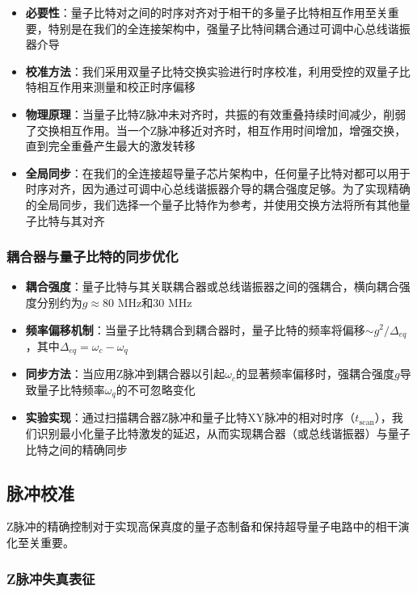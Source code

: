 \documentclass[11pt,a4paper]{article}
\begin{document}
\begin{itemize}
    \item \textbf{必要性}：量子比特对之间的时序对齐对于相干的多量子比特相互作用至关重要，特别是在我们的全连接架构中，强量子比特间耦合通过可调中心总线谐振器介导
    \item \textbf{校准方法}：我们采用双量子比特交换实验进行时序校准，利用受控的双量子比特相互作用来测量和校正时序偏移
    \item \textbf{物理原理}：当量子比特Z脉冲未对齐时，共振的有效重叠持续时间减少，削弱了交换相互作用。当一个Z脉冲移近对齐时，相互作用时间增加，增强交换，直到完全重叠产生最大的激发转移
    \item \textbf{全局同步}：在我们的全连接超导量子芯片架构中，任何量子比特对都可以用于时序对齐，因为通过可调中心总线谐振器介导的耦合强度足够。为了实现精确的全局同步，我们选择一个量子比特作为参考，并使用交换方法将所有其他量子比特与其对齐
\end{itemize}

\subsubsection{耦合器与量子比特的同步优化}

\begin{itemize}
    \item \textbf{耦合强度}：量子比特与其关联耦合器或总线谐振器之间的强耦合，横向耦合强度分别约为$g \approx 80$ MHz和$30$ MHz
    \item \textbf{频率偏移机制}：当量子比特耦合到耦合器时，量子比特的频率将偏移$\sim g^2/\Delta_{eq}$，其中$\Delta_{eq} = \omega_c - \omega_q$
    \item \textbf{同步方法}：当应用Z脉冲到耦合器以引起$\omega_c$的显著频率偏移时，强耦合强度$g$导致量子比特频率$\omega_q$的不可忽略变化
    \item \textbf{实验实现}：通过扫描耦合器Z脉冲和量子比特XY脉冲的相对时序（$t_{\text{scan}}$），我们识别最小化量子比特激发的延迟，从而实现耦合器（或总线谐振器）与量子比特之间的精确同步
\end{itemize}

\subsection{脉冲校准}

Z脉冲的精确控制对于实现高保真度的量子态制备和保持超导量子电路中的相干演化至关重要。

\subsubsection{Z脉冲失真表征}
\end{document}
